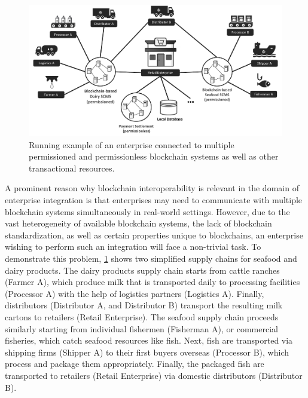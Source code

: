 \documentclass[review]{elsarticle}
\begin{document}
\begin{figure}
	\includegraphics[width=\linewidth]{graphics/scenario}
	\caption[Running example]{Running example of an enterprise connected to multiple permissioned and permissionless blockchain systems as well as other transactional resources.}
	\label{fig:scenario}
\end{figure}

A prominent reason why blockchain interoperability is relevant in the domain of enterprise integration is that enterprises may need to communicate with multiple blockchain systems simultaneously in real-world settings.
However, due to the vast heterogeneity of available blockchain systems, the lack of blockchain standardization, as well as certain properties unique to blockchains, an enterprise wishing to perform such an integration will face a non-trivial task.
To demonstrate this problem, \cref{fig:scenario} shows two simplified supply chains for seafood and dairy products.
The dairy products supply chain starts from cattle ranches (Farmer A), which produce milk that is transported daily to processing facilities (Processor A) with the help of logistics partners (Logistics A).
Finally, distributors (Distributor A, and Distributor B) transport the resulting milk cartons to retailers (Retail Enterprise).
The seafood supply chain proceeds similarly starting from individual fishermen (Fisherman A), or commercial fisheries, which catch seafood resources like fish.
Next, fish are transported via shipping firms (Shipper A) to their first buyers overseas (Processor B), which process and package them appropriately.
Finally, the packaged fish are transported to retailers (Retail Enterprise) via domestic distributors (Distributor B).
\end{document}
